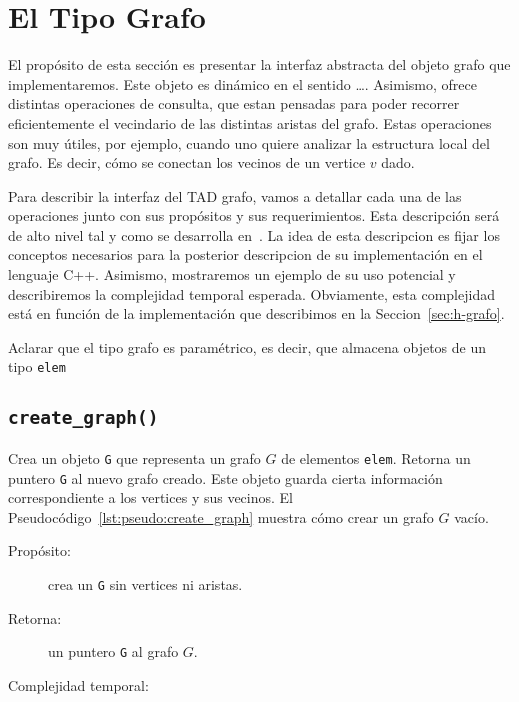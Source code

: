 \documentclass[a4paper,12pt]{article}
\makeatletter
\newcommand{\Code}[1]{\lstinline[basicstyle={\tt}]@#1@}
\makeatother
\begin{document}
\section{El Tipo Grafo}
\label{sec:tad grafo}

\def\lstlistingname{Pseudocódigo}
 
El propósito de esta sección es presentar la interfaz abstracta del objeto grafo que implementaremos.  Este objeto es dinámico en el sentido \ldots.  Asimismo, ofrece distintas operaciones de consulta, que estan pensadas para poder recorrer eficientemente el vecindario de las distintas aristas del grafo.  Estas operaciones son muy útiles, por ejemplo, cuando uno quiere analizar la estructura local del grafo.  Es decir, cómo se conectan los vecinos de un vertice $v$ dado.  

Para describir la interfaz del TAD grafo, vamos a detallar cada una de las operaciones junto con sus propósitos y sus requerimientos.  Esta descripción será de alto nivel tal y como se desarrolla en~\cite{}.  La idea de esta descripcion es fijar los conceptos necesarios para la posterior descripcion de su implementación en el lenguaje C++.  Asimismo, mostraremos un ejemplo de su uso potencial y describiremos la complejidad temporal esperada.  Obviamente, esta complejidad está en función de la implementación que describimos en la Seccion~\ref{sec:h-grafo}.  

Aclarar que el tipo grafo es paramétrico, es decir, que almacena objetos de un tipo \texttt{elem}

\subsection{\texttt{create\_graph()}}
\label{sec:tad grafo:create-graph}

Crea un objeto \Code{G} que representa un grafo $G$ de elementos \Code{elem}. Retorna un puntero \Code{G} al nuevo grafo creado. Este objeto guarda cierta información correspondiente a los vertices y sus vecinos. El \lstlistingname~\ref{lst:pseudo:create_graph} muestra cómo crear un grafo $G$ vacío.


\begin{description}
  \item [Propósito:] crea un \Code{G} sin vertices ni aristas.
  \item [Retorna:] un puntero \Code{G} al grafo $G$.
  \item [Complejidad temporal:]
\end{description}
\end{document}
